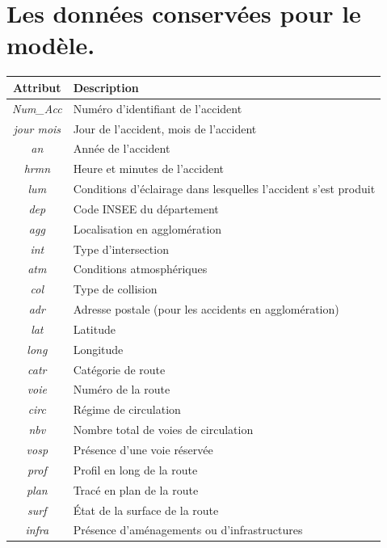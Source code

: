 \documentclass{article}
\begin{document}
    \section{Les données conservées pour le modèle.}\label{appendix:dataset}
    \begin{center}
        \begin{tabular}{ |c|p{9cm}| }
            \hline
            \textbf{Attribut} & \textbf{Description} \\
            \hline
            \textit{Num\_Acc} & Numéro d'identifiant de l'accident \\
            \textit{jour mois} & Jour de l'accident, mois de l'accident \\
            \textit{an} & Année de l'accident \\
            \textit{hrmn} & Heure et minutes de l'accident \\
            \textit{lum} & Conditions d'éclairage dans lesquelles l'accident s'est produit \\
            \textit{dep} & Code INSEE du département \\
            \textit{agg} & Localisation en agglomération \\
            \textit{int} & Type d'intersection \\
            \textit{atm} & Conditions atmosphériques \\
            \textit{col} & Type de collision \\
            \textit{adr} & Adresse postale (pour les accidents en agglomération) \\
            \textit{lat} & Latitude \\
            \textit{long} & Longitude \\
            \textit{catr} & Catégorie de route \\
            \textit{voie} & Numéro de la route \\
            \textit{circ} & Régime de circulation \\
            \textit{nbv} & Nombre total de voies de circulation \\
            \textit{vosp} & Présence d'une voie réservée \\
            \textit{prof} & Profil en long de la route \\
            \textit{plan} & Tracé en plan de la route \\
            \textit{surf} & État de la surface de la route \\
            \textit{infra} & Présence d'aménagements ou d'infrastructures \\

\end{tabular}
\end{center}
\end{document}

